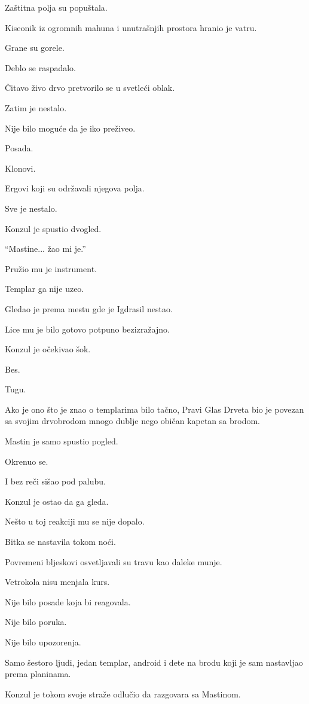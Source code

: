 Zaštitna polja su popuštala.

Kiseonik iz ogromnih mahuna i unutrašnjih prostora hranio je vatru.

Grane su gorele.

Deblo se raspadalo.

Čitavo živo drvo pretvorilo se u svetleći oblak.

Zatim je nestalo.

Nije bilo moguće da je iko preživeo.

Posada.

Klonovi.

Ergovi koji su održavali njegova polja.

Sve je nestalo.

Konzul je spustio dvogled.

``Mastine... žao mi je.''

Pružio mu je instrument.

Templar ga nije uzeo.

Gledao je prema mestu gde je Igdrasil nestao.

Lice mu je bilo gotovo potpuno bezizražajno.

Konzul je očekivao šok.

Bes.

Tugu.

Ako je ono što je znao o templarima bilo tačno, Pravi Glas Drveta bio je povezan sa svojim drvobrodom mnogo dublje nego običan kapetan sa brodom.

Mastin je samo spustio pogled.

Okrenuo se.

I bez reči sišao pod palubu.

Konzul je ostao da ga gleda.

Nešto u toj reakciji mu se nije dopalo.

\bigskip

Bitka se nastavila tokom noći.

Povremeni bljeskovi osvetljavali su travu kao daleke munje.

Vetrokola nisu menjala kurs.

Nije bilo posade koja bi reagovala.

Nije bilo poruka.

Nije bilo upozorenja.

Samo šestoro ljudi, jedan templar, android i dete na brodu koji je sam nastavljao prema planinama.

Konzul je tokom svoje straže odlučio da razgovara sa Mastinom.

